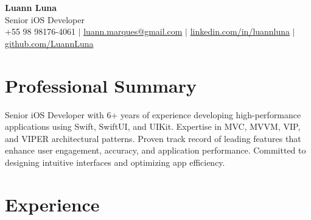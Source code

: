 \documentclass[11pt,letterpaper]{article}
\begin{document}
\begin{center}
    {\LARGE \textbf{Luann Luna}} \\
    \vspace{0.5em}
    Senior iOS Developer \\
    \vspace{0.3em}
    +55 98 98176-4061 $|$
    \href{mailto:luann.marques@gmail.com}{luann.marques@gmail.com} $|$
    \href{https://linkedin.com/in/luannluna}{linkedin.com/in/luannluna} $|$
    \href{https://github.com/LuannLuna}{github.com/LuannLuna}
\end{center}

\vspace{0.5em}

\section*{Professional Summary}
Senior iOS Developer with 6+ years of experience developing high-performance applications using Swift, SwiftUI, and UIKit. Expertise in MVC, MVVM, VIP, and VIPER architectural patterns. Proven track record of leading features that enhance user engagement, accuracy, and application performance. Committed to designing intuitive interfaces and optimizing app efficiency.

\section*{Experience}
\end{document}
